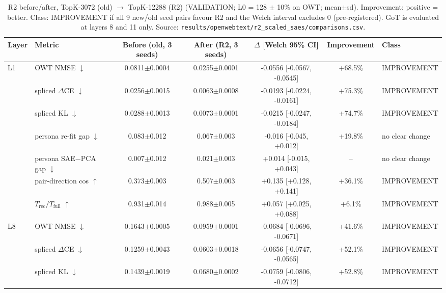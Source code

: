 \begin{table}[t]
\centering
\small
\caption{R2 before/after, TopK-3072 (old) $\rightarrow$ TopK-12288 (R2) (VALIDATION; L0 = 128 $\pm$ 10\% on OWT; mean$\pm$sd). Improvement: positive = better. Class: IMPROVEMENT if all 9 new/old seed pairs favour R2 and the Welch interval excludes 0 (pre-registered). GoT is evaluated at layers 8 and 11 only. Source: \texttt{results/\allowbreak{}openwebtext/\allowbreak{}r2\_scaled\_saes/\allowbreak{}comparisons.csv}.}
\label{tab:r2_c1}
\begin{adjustbox}{max width=\linewidth}
\begin{tabular}{llccccl}
\toprule
Layer & Metric & Before (old, 3 seeds) & After (R2, 3 seeds) & $\Delta$ [Welch 95\% CI] & Improvement & Class \\
\midrule
L1 & OWT NMSE $\downarrow$ & 0.0811$\pm$0.0004 & 0.0255$\pm$0.0001 & -0.0556 [-0.0567, -0.0545] & +68.5\% & IMPROVEMENT \\
 & spliced $\Delta$CE $\downarrow$ & 0.0256$\pm$0.0015 & 0.0063$\pm$0.0008 & -0.0193 [-0.0224, -0.0161] & +75.3\% & IMPROVEMENT \\
 & spliced KL $\downarrow$ & 0.0288$\pm$0.0013 & 0.0073$\pm$0.0001 & -0.0215 [-0.0247, -0.0184] & +74.7\% & IMPROVEMENT \\
 & persona re-fit gap $\downarrow$ & 0.083$\pm$0.012 & 0.067$\pm$0.003 & -0.016 [-0.045, +0.012] & +19.8\% & no clear change \\
 & persona SAE$-$PCA gap $\downarrow$ & 0.007$\pm$0.012 & 0.021$\pm$0.003 & +0.014 [-0.015, +0.043] & -- & no clear change \\
 & pair-direction cos $\uparrow$ & 0.373$\pm$0.003 & 0.507$\pm$0.003 & +0.135 [+0.128, +0.141] & +36.1\% & IMPROVEMENT \\
 & $T_{\text{rec}}/T_{\text{full}}$ $\uparrow$ & 0.931$\pm$0.014 & 0.988$\pm$0.005 & +0.057 [+0.025, +0.088] & +6.1\% & IMPROVEMENT \\
\midrule
L8 & OWT NMSE $\downarrow$ & 0.1643$\pm$0.0005 & 0.0959$\pm$0.0001 & -0.0684 [-0.0696, -0.0671] & +41.6\% & IMPROVEMENT \\
 & spliced $\Delta$CE $\downarrow$ & 0.1259$\pm$0.0043 & 0.0603$\pm$0.0018 & -0.0656 [-0.0747, -0.0565] & +52.1\% & IMPROVEMENT \\
 & spliced KL $\downarrow$ & 0.1439$\pm$0.0019 & 0.0680$\pm$0.0002 & -0.0759 [-0.0806, -0.0712] & +52.8\% & IMPROVEMENT \\

\end{tabular}
\end{adjustbox}
\end{table}
